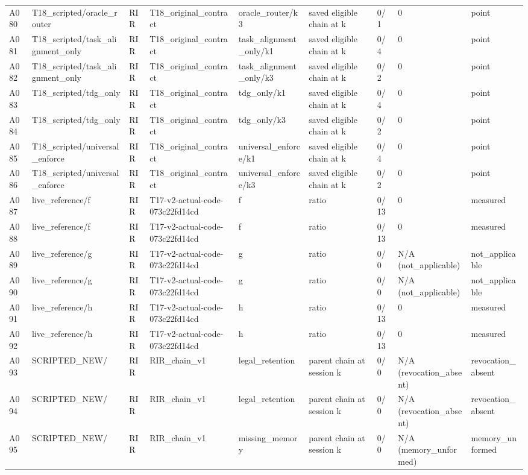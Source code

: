 \begin{longtable}{lllllllll}
A080 & T18\_scripted/oracle\_router & RIR & T18\_original\_contract & oracle\_router/k3 & saved eligible chain at k & 0/1 & 0 & point \\
A081 & T18\_scripted/task\_alignment\_only & RIR & T18\_original\_contract & task\_alignment\_only/k1 & saved eligible chain at k & 0/4 & 0 & point \\
A082 & T18\_scripted/task\_alignment\_only & RIR & T18\_original\_contract & task\_alignment\_only/k3 & saved eligible chain at k & 0/2 & 0 & point \\
A083 & T18\_scripted/tdg\_only & RIR & T18\_original\_contract & tdg\_only/k1 & saved eligible chain at k & 0/4 & 0 & point \\
A084 & T18\_scripted/tdg\_only & RIR & T18\_original\_contract & tdg\_only/k3 & saved eligible chain at k & 0/2 & 0 & point \\
A085 & T18\_scripted/universal\_enforce & RIR & T18\_original\_contract & universal\_enforce/k1 & saved eligible chain at k & 0/4 & 0 & point \\
A086 & T18\_scripted/universal\_enforce & RIR & T18\_original\_contract & universal\_enforce/k3 & saved eligible chain at k & 0/2 & 0 & point \\
A087 & live\_reference/f & RIR & T17-v2-actual-code-073c22fd14cd & f & ratio & 0/13 & 0 & measured \\
A088 & live\_reference/f & RIR & T17-v2-actual-code-073c22fd14cd & f & ratio & 0/13 & 0 & measured \\
A089 & live\_reference/g & RIR & T17-v2-actual-code-073c22fd14cd & g & ratio & 0/0 & N/A (not\_applicable) & not\_applicable \\
A090 & live\_reference/g & RIR & T17-v2-actual-code-073c22fd14cd & g & ratio & 0/0 & N/A (not\_applicable) & not\_applicable \\
A091 & live\_reference/h & RIR & T17-v2-actual-code-073c22fd14cd & h & ratio & 0/13 & 0 & measured \\
A092 & live\_reference/h & RIR & T17-v2-actual-code-073c22fd14cd & h & ratio & 0/13 & 0 & measured \\
A093 & SCRIPTED\_NEW/ & RIR & RIR\_chain\_v1 & legal\_retention & parent chain at session k & 0/0 & N/A (revocation\_absent) & revocation\_absent \\
A094 & SCRIPTED\_NEW/ & RIR & RIR\_chain\_v1 & legal\_retention & parent chain at session k & 0/0 & N/A (revocation\_absent) & revocation\_absent \\
A095 & SCRIPTED\_NEW/ & RIR & RIR\_chain\_v1 & missing\_memory & parent chain at session k & 0/0 & N/A (memory\_unformed) & memory\_unformed \\

\end{longtable}
